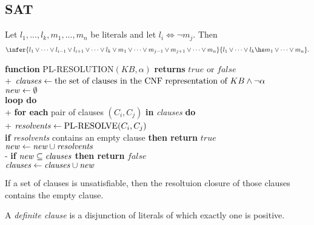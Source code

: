 \documentclass{article}
\begin{document}
\subsection{SAT}

\begin{theorem}
    Let $l_1,...,l_k,m_1,...,m_n$ be literals and let $l_i\Leftrightarrow\neg m_j$. Then
    \begin{align*}
        \infer{l_1\vee \cdots\vee l_{i-1}\vee l_{i+1}\vee\cdots\vee l_k\vee m_1\vee\cdots\vee m_{j-1}\vee m_{j+1}\vee \cdots\vee m_n}{
            l_1\vee\cdots \vee l_k\hs m_1\vee\cdots\vee m_n
        }.
    \end{align*}
\end{theorem}

\begin{pseudo}
    \textbf{function} PL-RESOLUTION$(KB,\alpha)$ \textbf{returns} $true$ or $false$\\+
        $\text{\emph{clauses}}\leftarrow \text{the set of clauses in the CNF representation of }KB\wedge\neg\alpha$\\
        $\text{\emph{new}}\leftarrow\emptyset$\\
        \textbf{loop do}\\+
            \textbf{for each} pair of clauses $(C_i,C_j)$ \textbf{in} \emph{clauses} \textbf{do}\\+
                $\text{\emph{resolvents}}\leftarrow\text{PL-RESOLVE}(C_i,C_j)$\\
                \textbf{if} \emph{resolvents} contains an empty clause \textbf{then return} $true$\\
                $\text{\emph{new}}\leftarrow \text{\emph{new}}\cup \text{\emph{resolvents}}$\\-
            \textbf{if} $\text{\emph{new}} \subseteq \text{\emph{clauses}}$ \textbf{then return} $false$\\
            $\text{\emph{clauses}}\leftarrow\text{\emph{clauses}}\cup\text{\emph{new}}$
\end{pseudo}

\begin{theorem}
    If a set of clauses is unsatisfiable, then the resoltuion closure of
    those clauses contains the empty clause. 
\end{theorem}

\begin{definition}
    A \emph{definite clause} is a disjunction of literals of which
    exactly one is positive.
\end{definition}
\end{document}
